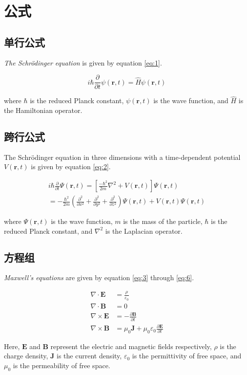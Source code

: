\section{公式}

\subsection{单行公式}

\emph{The Schrödinger equation} is given by equation \ref{eq:1}.

\begin{equation}
    \label{eq:1}
    i\hbar \frac{\partial}{\partial t} \psi(\mathbf{r}, t) = \hat{H} \psi(\mathbf{r}, t)
\end{equation}

where $\hbar$ is the reduced Planck constant, $\psi(\mathbf{r}, t)$ is the wave function, and $\hat{H}$ is the Hamiltonian operator.

\subsection{跨行公式}

The Schrödinger equation in three dimensions with a time-dependent potential $V(\mathbf{r}, t)$ is given by equation \ref{eq:2}.

\begin{multline}
    \label{eq:2}
    i\hbar \frac{\partial}{\partial t} \Psi(\mathbf{r}, t) = \left[\frac{-\hbar^2}{2m} \nabla^2 + V(\mathbf{r}, t)\right] \Psi(\mathbf{r}, t) \\
    = -\frac{\hbar^2}{2m} \left(\frac{\partial^2}{\partial x^2} + \frac{\partial^2}{\partial y^2} + \frac{\partial^2}{\partial z^2}\right) \Psi(\mathbf{r}, t) + V(\mathbf{r}, t) \Psi(\mathbf{r}, t)
\end{multline}

where $\Psi(\mathbf{r}, t)$ is the wave function, $m$ is the mass of the particle, $\hbar$ is the reduced Planck constant, and $\nabla^2$ is the Laplacian operator.

\subsection{方程组}

\emph{Maxwell's equations} are given by equation \ref{eq:3} through \ref{eq:6}.

\begin{align}
    \label{eq:3} \nabla \cdot \mathbf{E}  & = \frac{\rho}{\varepsilon_0}                                                   \\
    \label{eq:4} \nabla \cdot \mathbf{B}  & = 0                                                                            \\
    \label{eq:5} \nabla \times \mathbf{E} & = -\frac{\partial \mathbf{B}}{\partial t}                                      \\
    \label{eq:6} \nabla \times \mathbf{B} & = \mu_0 \mathbf{J} + \mu_0\varepsilon_0 \frac{\partial \mathbf{E}}{\partial t}
\end{align}

Here, $\mathbf{E}$ and $\mathbf{B}$ represent the electric and magnetic fields respectively, $\rho$ is the charge density, $\mathbf{J}$ is the current density, $\varepsilon_0$ is the permittivity of free space, and $\mu_0$ is the permeability of free space.

